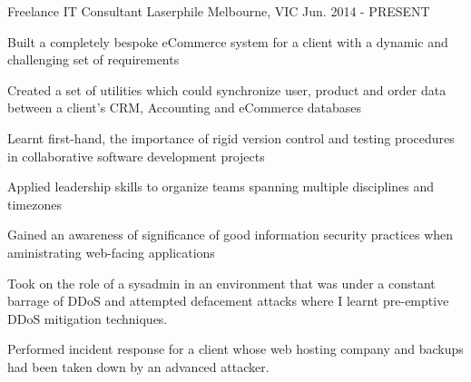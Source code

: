 \begin{cventries}
  \cventry
    {Freelance IT Consultant} %
    {Laserphile} %
    {Melbourne, VIC} %
    {Jun. 2014 - PRESENT} %
    {
      \begin{cvitems} %
        \item {Built a completely bespoke eCommerce system for a client with a dynamic and challenging set of requirements}
        \item {Created a set of utilities which could synchronize user, product and order data between a client's CRM, Accounting and eCommerce databases}
        \item {Learnt first-hand, the importance of rigid version control and testing procedures in collaborative software development projects}
        \item {Applied leadership skills to organize teams spanning multiple disciplines and timezones}
        \item {Gained an awareness of significance of good information security practices when aministrating web-facing applications}
        \item {Took on the role of a sysadmin in an environment that was under a constant barrage of DDoS and attempted defacement attacks where I learnt pre-emptive DDoS mitigation techniques.}
        \item {Performed incident response for a client whose web hosting company and backups had been taken down by an advanced attacker.}
      \end{cvitems}
    }

\end{cventries}
